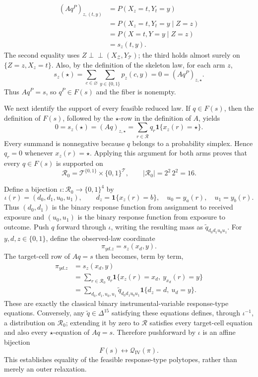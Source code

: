 \[
\begin{aligned}
(Aq^P)_{z,(t,y)}
&=P(X_z=t,Y_t=y)\\
&=P(X_z=t,Y_t=y\mid Z=z)\\
&=P(X=t,Y=y\mid Z=z)\\
&=s_z(t,y).
\end{aligned}
\]
The second equality uses \(Z\perp\!\!\!\perp(X_{\mathcal Z},Y_{\mathcal T})\); the third holds almost surely on \(\{Z=z,X_z=t\}\). Also, by the definition of the skeleton law, for each arm \(z\),
\[
s_z(\star)=\sum_{c\in\varnothing}\sum_{y\in\{0,1\}}p_z(c,y)=0=(Aq^P)_{z,\star}.
\]
Thus \(Aq^P=s\), so \(q^P\in F(s)\) and the fiber is nonempty.

We next identify the support of every feasible reduced law. 
If \(q\in F(s)\), then the definition of \(F(s)\), followed by the \(\star\)-row in the definition of \(A\), yields
\[
0=s_z(\star)=(Aq)_{z,\star}
 =\sum_{r\in\mathcal R}q_r\mathbf 1\{x_z(r)=\star\}.
\]
Every summand is nonnegative because \(q\) belongs to a probability simplex. Hence \(q_r=0\) whenever \(x_z(r)=\star\). Applying this argument for both arms proves that every \(q\in F(s)\) is supported on
\[
\mathcal R_0=\mathcal T^{\{0,1\}}\times\{0,1\}^{\mathcal T},
\qquad |\mathcal R_0|=2^2\,2^2=16.
\]

Define a bijection \(\iota:\mathcal R_0\to\{0,1\}^4\) by
\[
\iota(r)=(d_0,d_1,u_0,u_1),\qquad
d_z=\mathbf 1\{x_z(r)=b\},\quad u_0=y_a(r),\quad u_1=y_b(r).
\]
Thus \((d_0,d_1)\) is the binary response function from assignment to received exposure and \((u_0,u_1)\) is the binary response function from exposure to outcome. Push \(q\) forward through \(\iota\), writing the resulting mass as \(\widetilde q_{d_0d_1u_0u_1}\). For \(y,d,z\in\{0,1\}\), define the observed-law coordinate
\[
\pi_{yd.z}=s_z(x_d,y).
\]
The target-cell row of \(Aq=s\) then becomes, term by term,
\[
\begin{aligned}
\pi_{yd.z}
&=s_z(x_d,y)\\
&=\sum_{r\in\mathcal R_0}q_r
  \mathbf 1\{x_z(r)=x_d,\ y_{x_d}(r)=y\}\\
&=\sum_{d_0,d_1,u_0,u_1}
  \widetilde q_{d_0d_1u_0u_1}
  \mathbf 1\{d_z=d,\ u_d=y\}.
\end{aligned}
\]
These are exactly the classical binary instrumental-variable response-type equations. Conversely, any \(\widetilde q\in\Delta^{15}\) satisfying these equations defines, through \(\iota^{-1}\), a distribution on \(\mathcal R_0\); extending it by zero to \(\mathcal R\) satisfies every target-cell equation and also every \(\star\)-equation of \(Aq=s\). Therefore pushforward by \(\iota\) is an affine bijection
\[
F(s)\longleftrightarrow\mathcal Q_{\mathrm{IV}}(\pi).
\]
This establishes equality of the feasible response-type polytopes, rather than merely an outer relaxation.

